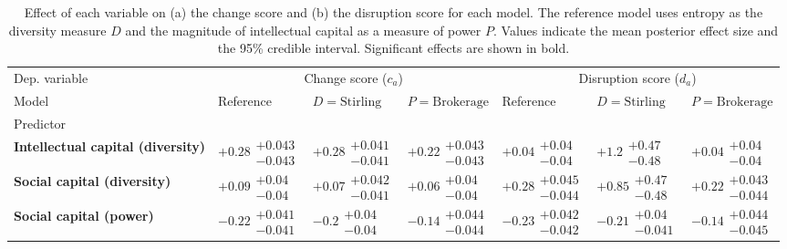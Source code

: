 \begin{table}[H]
\centering
\caption{Effect of each variable on (a) the change score and (b) the disruption score for each model. The reference model uses entropy as the diversity measure $D$ and the magnitude of intellectual capital as a measure of power $P$. Values indicate the mean posterior effect size and the 95\% credible interval. Significant effects are shown in bold.}
\label{table:summary_change_disruption}
\renewcommand{\arraystretch}{2}\fontsize{6}{7}\selectfont\begin{tabular}{lllllll}
\toprule
Dep. variable & \multicolumn{3}{c}{Change score ($c_a$)} & \multicolumn{3}{c}{Disruption score ($d_a$)} \\
Model &                                Reference &                      $D=\text{Stirling}$ &                     $P=\text{Brokerage}$ &                                Reference &                      $D=\text{Stirling}$ &                     $P=\text{Brokerage}$ \\
Predictor                                 &                                          &                                          &                                          &                                          &                                          &                                          \\
\midrule
\textbf{Intellectual capital (diversity)} &  $\bm{+0.28}\substack{+0.043 \\ -0.043}$ &  $\bm{+0.28}\substack{+0.041 \\ -0.041}$ &  $\bm{+0.22}\substack{+0.043 \\ -0.043}$ &    $\bm{+0.04}\substack{+0.04 \\ -0.04}$ &     $\bm{+1.2}\substack{+0.47 \\ -0.48}$ &         $+0.04\substack{+0.04 \\ -0.04}$ \\
\textbf{Social capital (diversity)}       &    $\bm{+0.09}\substack{+0.04 \\ -0.04}$ &  $\bm{+0.07}\substack{+0.042 \\ -0.041}$ &    $\bm{+0.06}\substack{+0.04 \\ -0.04}$ &  $\bm{+0.28}\substack{+0.045 \\ -0.044}$ &    $\bm{+0.85}\substack{+0.47 \\ -0.48}$ &  $\bm{+0.22}\substack{+0.043 \\ -0.044}$ \\
\textbf{Social capital (power)}           &  $\bm{-0.22}\substack{+0.041 \\ -0.041}$ &     $\bm{-0.2}\substack{+0.04 \\ -0.04}$ &  $\bm{-0.14}\substack{+0.044 \\ -0.044}$ &  $\bm{-0.23}\substack{+0.042 \\ -0.042}$ &   $\bm{-0.21}\substack{+0.04 \\ -0.041}$ &  $\bm{-0.14}\substack{+0.044 \\ -0.045}$ \\

\end{tabular}
\end{table}
